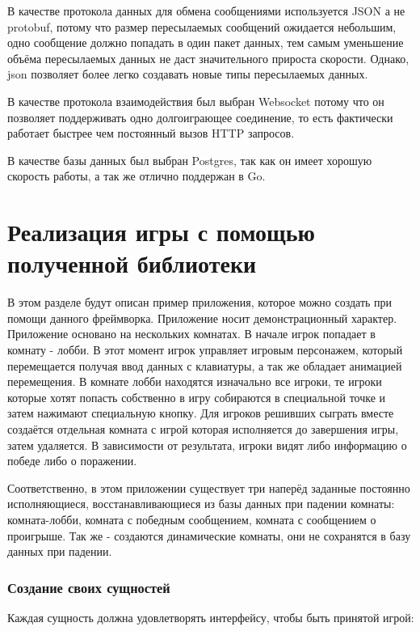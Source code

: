 \documentclass[a4paper,14pt, openany]{book}
\begin{document}
В качестве протокола данных для обмена сообщениями используется JSON а не protobuf, потому что размер пересылаемых сообщений ожидается небольшим, одно сообщение должно попадать в один пакет данных, тем самым уменьшение объёма пересылаемых данных не даст значительного прироста скорости. Однако, json позволяет более легко создавать новые типы пересылаемых данных.

В качестве протокола взаимодействия был выбран Websocket потому что он позволяет поддерживать одно долгоиграющее соединение, то есть фактически работает быстрее чем постоянный вызов HTTP запросов.

В качестве базы данных был выбран Postgres, так как он имеет хорошую скорость работы, а так же отлично поддержан в Go. 


\chapter{Реализация игры с помощью полученной библиотеки}

В этом разделе будут описан пример приложения, которое можно создать при помощи данного фреймворка. Приложение носит демонстрационный характер. Приложение основано на нескольких комнатах. В начале игрок попадает в комнату - лобби. В этот момент игрок управляет игровым персонажем, который перемещается получая ввод данных с клавиатуры, а так же обладает анимацией перемещения. В комнате лобби находятся изначально все игроки, те игроки которые хотят попасть собственно в игру собираются в специальной точке и затем нажимают специальную кнопку. Для игроков решивших сыграть вместе создаётся отдельная комната с игрой которая исполняется до завершения игры, затем удаляется. В зависимости от результата, игроки видят либо информацию о победе либо о поражении. 

Соответственно, в этом приложении существует три наперёд заданные постоянно исполняющиеся, восстанавливающиеся из базы данных при падении комнаты: комната-лобби, комната с победным сообщением, комната с сообщением о проигрыше. Так же - создаются динамические комнаты, они не сохранятся в базу данных при падении.  

\subsection{Создание своих сущностей}

Каждая сущность должна удовлетворять интерфейсу, чтобы быть принятой игрой:

\end{document}

